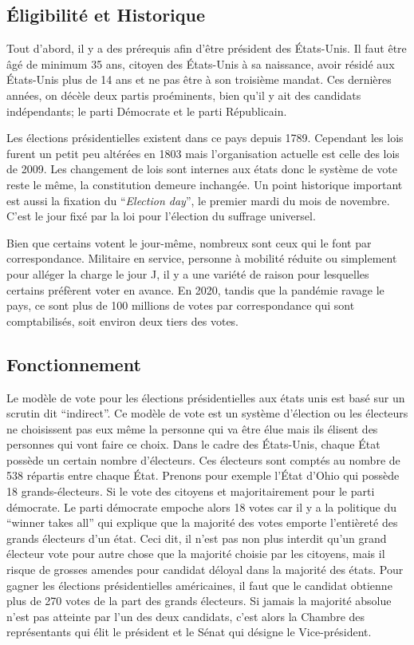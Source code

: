 \documentclass[12pt,a4paper]{report}
\begin{document}
\subsection{Éligibilité et Historique}

Tout d’abord, il y a des prérequis afin d’être président des États-Unis.
Il faut être âgé de minimum 35 ans, citoyen des États-Unis à sa naissance, avoir résidé aux États-Unis plus de 14 ans et ne pas être à son troisième mandat.
Ces dernières années, on décèle deux partis proéminents, bien qu'il y ait des candidats indépendants; le parti Démocrate et le parti Républicain.

Les élections présidentielles existent dans ce pays depuis 1789.
Cependant les lois furent un petit peu altérées en 1803 mais l'organisation actuelle est celle des lois de 2009.
Les changement de lois sont internes aux états donc le système de vote reste le même, la constitution demeure inchangée.
Un point historique important est aussi la fixation du “\textit{Election day}”, le premier mardi du mois de novembre.
C’est le jour fixé par la loi pour l'élection du suffrage universel.

Bien que certains votent le jour-même, nombreux sont ceux qui le font par correspondance.
Militaire en service, personne à mobilité réduite ou simplement pour alléger la charge le jour J, il y a une variété de raison pour lesquelles certains préfèrent voter en avance.
En 2020, tandis que la pandémie ravage le pays, ce sont plus de 100 millions de votes par correspondance qui sont comptabilisés, soit environ deux tiers des votes. \nocite{electproj:electproj}

\subsection{Fonctionnement} %
Le modèle de vote pour les élections présidentielles aux états unis est basé sur un scrutin dit “indirect”.
Ce modèle de vote est un système d'élection ou les électeurs ne choisissent pas eux même la personne qui va être élue mais ils élisent des personnes qui vont faire ce choix.
Dans le cadre des États-Unis, chaque État possède un certain nombre d'électeurs.
Ces électeurs sont comptés au nombre de 538 répartis entre chaque État.
Prenons pour exemple l'État d'Ohio qui possède 18 grands-électeurs.
Si le vote des citoyens et majoritairement pour le parti démocrate.
Le parti démocrate empoche alors 18 votes car il y a la politique du “winner takes all” qui explique que la majorité des votes emporte l'entièreté des grands électeurs d’un état.
Ceci dit, il n’est pas non plus interdit qu’un grand électeur vote pour autre chose que la majorité choisie par les citoyens, mais il risque de grosses amendes pour candidat déloyal dans la majorité des états.
Pour gagner les élections présidentielles américaines, il faut que le candidat obtienne plus de 270 votes de la part des grands électeurs.
Si jamais la majorité absolue n’est pas atteinte par l’un des deux candidats, c’est alors la Chambre des représentants qui élit le président et le Sénat qui désigne le Vice-président.
\nocite{wiki:electday}
\nocite{wiki:elecus}
\nocite{wiki:eleccoll}
\end{document}
